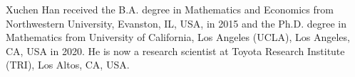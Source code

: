\begin{IEEEbiography}
{Xuchen Han} received the B.A. degree in Mathematics and Economics from
Northwestern University, Evanston, IL, USA, in 2015 and the Ph.D. degree in
Mathematics from University of California, Los Angeles (UCLA), Los Angeles, CA,
USA in 2020. He is now a research scientist at Toyota Research Institute (TRI),
Los Altos, CA, USA.
\end{IEEEbiography}
